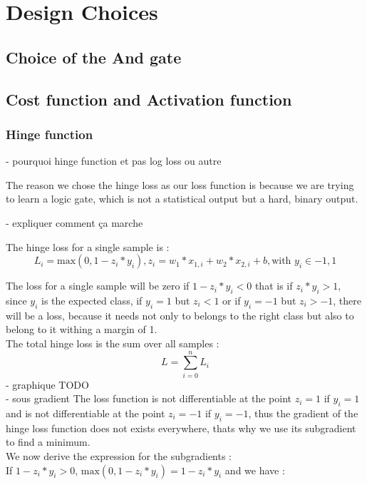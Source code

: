 \section{Design Choices}
\subsection{Choice of the And gate}

\subsection{Cost function and Activation function}
\subsubsection{Hinge function}
- pourquoi hinge function et pas log loss ou autre

The reason we chose the hinge loss as our loss function is because we are trying to learn a logic gate, which is not a statistical output but a hard, binary output.

- expliquer comment ça marche

The hinge loss for a single sample is :
\begin{equation}
    L_i = \text{max}(0, 1 - z_i*y_i), z_i = w_1*x_{1,i} + w_2*x_{2,i} + b , \text{with } y_i \in {-1, 1}
\end{equation}

The loss for a single sample will be zero if $1 - z_i*y_i < 0$ that is if $z_i*y_i > 1$, since $y_i$ is the expected class, if $y_i = 1$ but $z_i < 1$ or if $y_i = -1$ but $z_i > -1$, there will be a loss, because it needs not only to belongs to the right class but also to belong to it withing a margin of 1.\\

The total hinge loss is the sum over all samples :
\begin{equation}
    L = \sum_{i = 0}^{n} {L_i}
\end{equation}
- graphique 
TODO\\
- sous gradient
The loss function is not differentiable at the point $z_i = 1$ if $y_i = 1$ and is not differentiable at the point $z_i = -1$ if $y_i = -1$, thus the gradient of the hinge loss function does not exists everywhere, thats why we use its subgradient to find a minimum.\\
We now derive the expression for the subgradients :\\

If $1 - z_i*y_i > 0$, $\text{max}(0, 1 - z_i*y_i) = 1 - z_i*y_i$ and we have :

